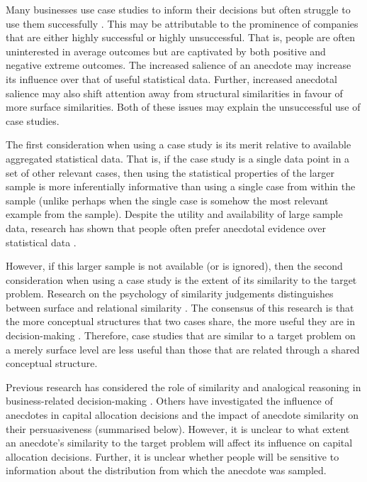 \documentclass[a4paper, nobind]{templates/ociamthesis}
\theoremstyle{definition}
\theoremstyle{definition}
\theoremstyle{definition}
\theoremstyle{definition}
\theoremstyle{remark}
\begin{document}
Many businesses use case studies to inform their decisions but often struggle to
use them successfully \autocite{gavetti2005a}. This may be attributable to the
prominence of companies that are either highly successful or highly
unsuccessful. That is, people are often uninterested in average outcomes but are
captivated by both positive and negative extreme outcomes. The increased
salience of an anecdote may increase its influence over that of useful
statistical data. Further, increased anecdotal salience may also shift attention
away from structural similarities in favour of more surface similarities. Both
of these issues may explain the unsuccessful use of case studies.

The first consideration when using a case study is its merit relative to
available aggregated statistical data. That is, if the case study is a single
data point in a set of other relevant cases, then using the statistical
properties of the larger sample is more inferentially informative than using a
single case from within the sample (unlike perhaps when the single case is
somehow the most relevant example from the sample). Despite the utility and
availability of large sample data, research has shown that people often prefer
anecdotal evidence over statistical data \autocite{reinard1988,shen2015,jaramillo2019,freling2020}.

However, if this larger sample is not available (or is ignored), then the second
consideration when using a case study is the extent of its similarity to the
target problem. Research on the psychology of similarity judgements
distinguishes between surface and relational similarity \autocite{gentner1983}. The
consensus of this research is that the more conceptual structures that two cases
share, the more useful they are in decision-making \autocite{markman1995,lassaline1996}. Therefore, case studies that are similar to a target problem on
a merely surface level are less useful than those that are related through a
shared conceptual structure.

Previous research has considered the role of similarity and analogical reasoning
in business-related decision-making \autocite[e.g.,][]{gavetti2005}. Others have
investigated the influence of anecdotes in capital allocation decisions and the
impact of anecdote similarity on their persuasiveness (summarised below).
However, it is unclear to what extent an anecdote's similarity to the target
problem will affect its influence on capital allocation decisions. Further, it
is unclear whether people will be sensitive to information about the
distribution from which the anecdote was sampled.
\end{document}
